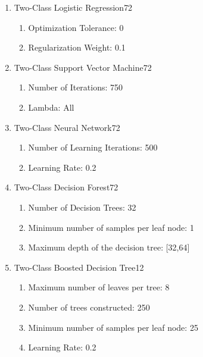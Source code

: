 \begin{enumerate}
    \item{Two-Class Logistic Regression}72
    
    \begin{enumerate}
        \item{Optimization Tolerance:} 0
        \item{Regularization Weight:} 0.1
    \end{enumerate}
    
    \item{Two-Class Support Vector Machine}72
    
    \begin{enumerate}
        \item{Number of Iterations:} 750
        \item{Lambda:} All
    \end{enumerate}
    
    \item{Two-Class Neural Network}72
    
    \begin{enumerate}
        \item{Number of Learning Iterations:} 500
        \item{Learning Rate:} 0.2
    \end{enumerate}
    
    \item{Two-Class Decision Forest}72

    \begin{enumerate}
        \item{Number of Decision Trees:} 32
        \item{Minimum number of samples per leaf node:} 1
        \item{Maximum depth of the decision tree:} [32,64]
    \end{enumerate}
    
    \item{Two-Class Boosted Decision Tree}12
    
    \begin{enumerate}
        \item{Maximum number of leaves per tree:} 8
        \item{Number of trees constructed:} 250
        \item{Minimum number of samples per leaf node:} 25
        \item{Learning Rate:} 0.2
    \end{enumerate}
    
\end{enumerate}



